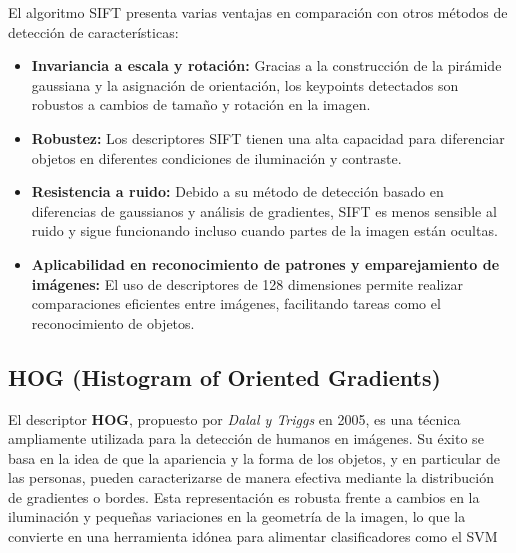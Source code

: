 \documentclass[a4paper]{article}
\begin{document}
  El algoritmo SIFT presenta varias ventajas en comparación con otros métodos de detección de características:
  
  \begin{itemize}
      \item \textbf{Invariancia a escala y rotación:}  
      Gracias a la construcción de la pirámide gaussiana y la asignación de orientación, los keypoints detectados son robustos a cambios de tamaño y rotación en la imagen.
      
      \item \textbf{Robustez:}  
      Los descriptores SIFT tienen una alta capacidad para diferenciar objetos en diferentes condiciones de iluminación y contraste.
      
      \item \textbf{Resistencia a ruido:}  
      Debido a su método de detección basado en diferencias de gaussianos y análisis de gradientes, SIFT es menos sensible al ruido y sigue funcionando incluso cuando partes de la imagen están ocultas.
      
      \item \textbf{Aplicabilidad en reconocimiento de patrones y emparejamiento de imágenes:}  
      El uso de descriptores de 128 dimensiones permite realizar comparaciones eficientes entre imágenes, facilitando tareas como el reconocimiento de objetos.
  \end{itemize}
  
  \par\vspace{0.5cm}
 


  \subsection{HOG (Histogram of Oriented Gradients)}
  \par\vspace{0.5cm}

  El descriptor \textbf{HOG}, propuesto por \textit{Dalal y Triggs} en 2005, es una técnica ampliamente utilizada para la detección de humanos en imágenes. Su éxito se basa en la idea de que la apariencia y la forma de los objetos, y en particular de las personas, pueden caracterizarse de manera efectiva mediante la distribución de gradientes o bordes. Esta representación es robusta frente a cambios en la iluminación y pequeñas variaciones en la geometría de la imagen, lo que la convierte en una herramienta idónea para alimentar clasificadores como el SVM
\end{document}
